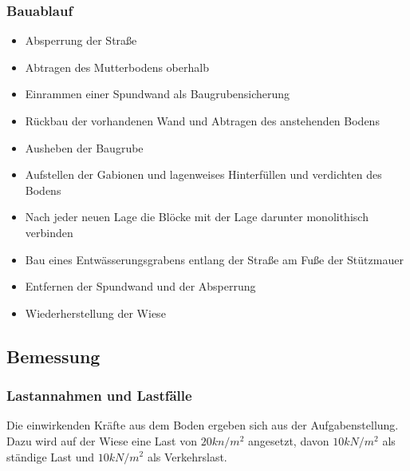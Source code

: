 \documentclass[11pt,fleqn,a4paper]{article}
\begin{document}
\subsubsection*{Bauablauf}
\begin{itemize}
\item Absperrung der Straße
\item Abtragen des Mutterbodens oberhalb
\item Einrammen einer Spundwand als Baugrubensicherung
\item Rückbau der vorhandenen Wand und Abtragen des anstehenden Bodens
\item Ausheben der Baugrube 
\item Aufstellen der Gabionen und lagenweises Hinterfüllen und verdichten des Bodens
\item Nach jeder neuen Lage die Blöcke mit der Lage darunter monolithisch verbinden
\item Bau eines Entwässerungsgrabens entlang der Straße am Fuße der Stützmauer
\item Entfernen der Spundwand und der Absperrung
\item Wiederherstellung der Wiese
\end{itemize}
\subsection{Bemessung}
\subsubsection{Lastannahmen und Lastfälle}
Die einwirkenden Kräfte aus dem Boden ergeben sich aus der Aufgabenstellung. Dazu wird auf der Wiese eine Last von $20kn/m^2$ angesetzt, davon $10kN/m^2$ als ständige Last und $10kN/m^2$ als Verkehrslast.
\end{document}
